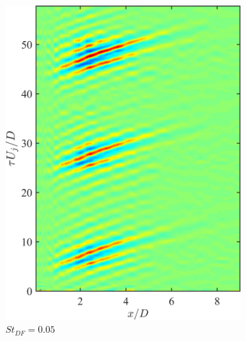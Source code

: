 \begin{figure}
	\centering
	\begin{subfigure}{0.33\textwidth}
		\centering
		\includegraphics[width=0.95\linewidth]{Figures/ch5_St005_modulated_source.png}
		\caption{$St_{DF} = 0.05$}
	\end{subfigure} %
	\begin{subfigure}{0.33\textwidth}
		\centering

\end{subfigure}
\end{figure}
